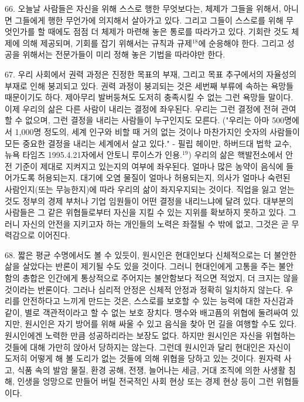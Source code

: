 \documentclass[11pt,a4paper]{article}
\begin{document}
\begin{multicols}{2}
66. 오늘날 사람들은 자신을 위해 스스로 행한 무엇보다는, 체제가 그들을 위해서, 아니면 그들에게 행한  무언가에 의지해서 살아가고 있다. 그리고 그들이 스스로를 위해 무엇인가를 할 때에도 점점 더 체제가  마련해 놓은 통로를 따라가고 있다. 기회란 것도 체제에 의해 제공되며, 기회를 잡기 위해서는 규칙과  규제\hyperlink{18}{$^{18}$}에 순응해야 한다. 그리고 성공을 위해서는 전문가들이 미리 정해 놓은 기법을 따라야만 한다. 


67. 우리 사회에서 권력 과정은 진정한 목표의 부재, 그리고 목표 추구에서의 자율성의 부재로 인해  붕괴되고 있다. 권력 과정이 붕괴되는 것은 세번째 부류에 속하는 욕망들 때문이기도 하다. 제아무리  발버둥쳐도 도저히 충족시킬 수 없는 그런 욕망들 말이다. 이제 우리의 삶은 다른 사람이 내리는 결정에  좌우된다. 우리는 그런 결정에 전혀 관여할 수 없으며, 그런 결정을 내리는 사람들이 누구인지도 모른다.  ("우리는 아마 500명에서 1,000명 정도의, 세계 인구와 비할 때 거의 없는 것이나 마찬가지인 숫자의  사람들이 모든 중요한 결정을 내리는 세계에서 살고 있다." - 필립 헤이만, 하버드대 법학 교수, \textlangle{}뉴욕 타임즈\textrangle{} 1995.4.21자에서 안토니 루이스가 인용.\hyperlink{19}{$^{19}$}) 우리의 삶은 핵발전소에서 안전 기준이 제대로  지켜지고 있는지의 여부에 좌우된다. 얼마나 많은 농약이 음식에 들어가도록 허용되는지. 대기에 오염 물질이 얼마나 허용되는지, 의사가 얼마나 숙련된 사람인지(또는 무능한지)에 따라 우리의 삶이  좌지우지되는 것이다. 직업을 잃고 얻는 것도 정부의 경제 부처나 기업 임원들이 어떤 결정을 내리느냐에  달려 있다. 대부분의 사람들은 그 같은 위협들로부터 자신을 지킬 수 있는 지위를 확보하지 못하고 있다.  그러니 자신의 안전을 지키고자 하는 개인들의 노력은 좌절될 수 밖에 없고, 그것은 곧 무력감으로  이어진다. 


68. 짧은 평균 수명에서도 볼 수 있듯이, 원시인은 현대인보다 신체적으로는 더 불안한 삶을 살았다는  반론이 제기될 수도 있을 것이다. 그러니 현대인에게 고통을 주는 불안함의 총합은 인간에게 통상적으로  주어지는 불안함보다 적으면 적었지, 더 크지는 않을 것이라는 반론이다. 그러나 심리적 안정은 신체적  안정과 정확히 일치하지 않는다. 우리를 안전하다고 느끼게 만드는 것은, 스스로를 보호할 수 있는 능력에 대한 자신감과 같이, 별로 객관적이라고 할 수 없는 보호 장치다. 맹수와 배고픔의 위협에 둘려싸여  있지만, 원시인은 자기 방어를 위해 싸울 수 있고 음식을 찾아 먼 길을 여행할 수도 있다. 원시인에겐
노력한 만큼 성공하리라는 보장도 없다. 하지만 원시인은 자신을 위협하는 것들에 대해 가만히 앉아서  당하지는 않는다. 그런데 원시인과 달리 현대인은 자신이 도저히 어떻게 해 볼 도리가 없는 것들에 의해  위협을 당하고 있는 것이다. 원자력 사고, 식품 속의 발암 물질, 환경 공해, 전쟁, 늘어나는 세금, 거대  조직에 의한 사생활 침해, 인생을 엉망으로 만들어 버릴 전국적인 사회 현상 또는 경제 현상 등이 그런  위협들이다. 



\end{multicols}
\end{document}
